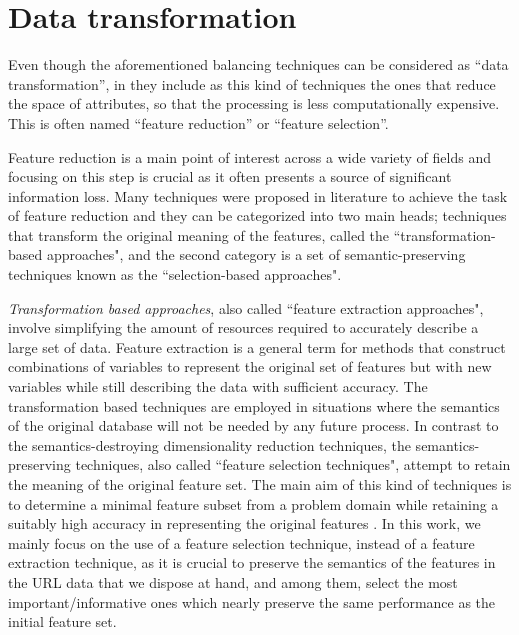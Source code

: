 \section{Data transformation}

Even though the aforementioned balancing techniques can be considered as ``data transformation'', in \cite{fayyad1996data} they include as this kind of techniques the ones that reduce the space of attributes, so that the processing is less computationally expensive. This is often named ``feature reduction'' or ``feature selection''.

Feature reduction is a main point of interest across a wide variety of fields and focusing on this step is crucial as it often presents a source of significant information loss. Many techniques were proposed in literature to achieve the task of feature reduction and they can be categorized into two main heads; techniques that transform the original meaning of the features, called the ``transformation-based approaches", and the second category is a set of semantic-preserving techniques known as the ``selection-based approaches".

\textit{Transformation based approaches}, also called ``feature extraction approaches", involve simplifying the amount of resources required to accurately describe a large set of data. Feature extraction is a general term for methods that construct combinations of variables to represent the original set of features but with new variables while still describing the data with sufficient accuracy. The transformation based techniques are employed in situations where the semantics of the original database will not be needed by any future process. In contrast to the semantics-destroying dimensionality reduction techniques, the semantics-preserving techniques, also called ``feature selection techniques", attempt to retain the meaning of the original
feature set. The main aim of this kind of techniques is to determine a minimal feature subset from a problem domain while retaining a suitably high accuracy in representing the original features \cite{liu1998feature}. In this work, we mainly focus on the use of a feature selection technique, instead of a feature extraction technique, as it is crucial to preserve the semantics of the features in the URL data that we dispose at hand, and among them, select the most important/informative ones which nearly preserve  the same performance as the initial feature set.

